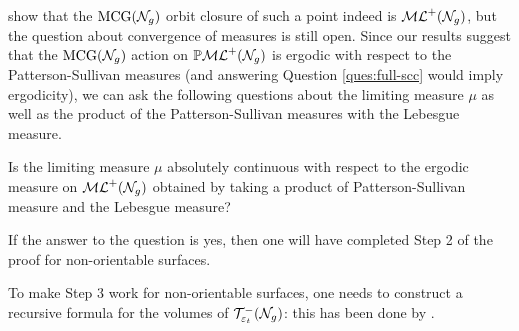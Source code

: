 \textcite{erlandsson2023mapping} show that the $\mathrm{MCG}(\mathcal{N}_g)$ orbit closure of such a point indeed is $\mathcal{ML}^+(\mathcal{N}_g)$, but the question about convergence of measures is still open.
Since our results suggest that the $\mathrm{MCG}(\mathcal{N}_g)$ action on $\mathbb{P}\mathcal{ML}^+(\mathcal{N}_g)$ is ergodic with respect to the Patterson-Sullivan measures (and answering Question \ref{ques:full-scc} would imply ergodicity), we can ask the following questions about the limiting measure $\mu$ as well as the product of the Patterson-Sullivan measures with the Lebesgue measure.

\begin{question}
  Is the limiting measure $\mu$ absolutely continuous with respect to the ergodic measure on $\mathcal{ML}^+(\mathcal{N}_g)$ obtained by taking a product of Patterson-Sullivan measure and the Lebesgue measure?
\end{question}
If the answer to the question is yes, then one will have completed Step 2 of the proof for non-orientable surfaces.

To make Step 3 work for non-orientable surfaces, one needs to construct a recursive formula for the volumes of $\mathcal{T}_{\varepsilon_t}^{-}(\mathcal{N}_g)$: this has been done by \textcite{stanford2023mirzakhani}.





